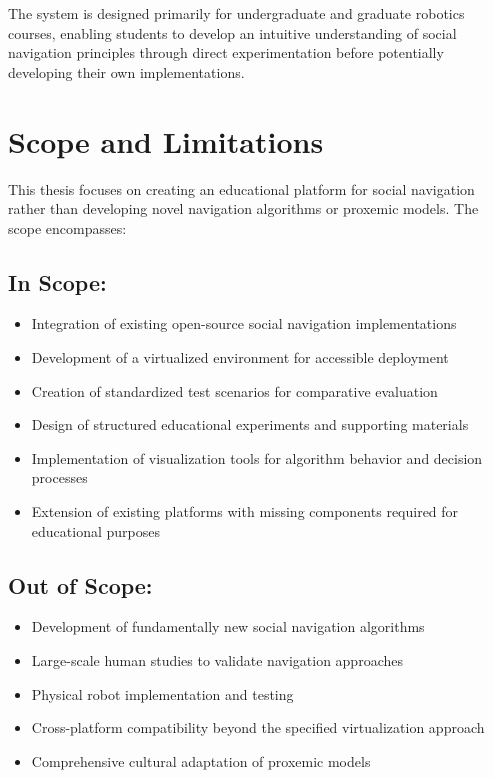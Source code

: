 The system is designed primarily for undergraduate and graduate robotics courses, 
enabling students to develop an intuitive understanding of social navigation 
principles through direct experimentation before potentially developing their 
own implementations.

\section{Scope and Limitations}

This thesis focuses on creating an educational platform for social navigation rather than developing novel navigation algorithms or proxemic models. The scope encompasses:

\subsection*{In Scope:}
\begin{itemize}
    \item Integration of existing open-source social navigation implementations
    \item Development of a virtualized environment for accessible deployment
    \item Creation of standardized test scenarios for comparative evaluation
    \item Design of structured educational experiments and supporting materials
    \item Implementation of visualization tools for algorithm behavior and decision processes
    \item Extension of existing platforms with missing components required for educational purposes
\end{itemize}

\subsection*{Out of Scope:}
\begin{itemize}
    \item Development of fundamentally new social navigation algorithms
    \item Large-scale human studies to validate navigation approaches
    \item Physical robot implementation and testing
    \item Cross-platform compatibility beyond the specified virtualization approach
    \item Comprehensive cultural adaptation of proxemic models
\end{itemize}

